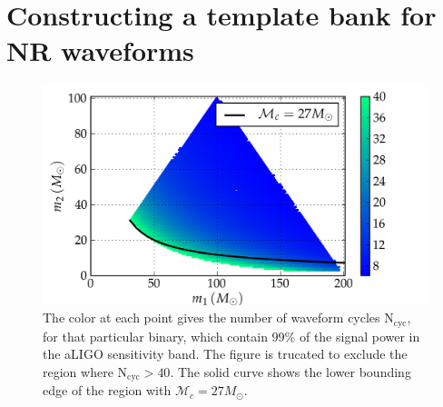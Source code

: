 \documentclass[aps,
prd,
twocolumn,
superscriptaddress,
lengthcheck,showpacs,letterpaper,nofootinbib,
floatfix]{revtex4-1}
\newcommand{\mn}{\mathrm{min}}
\newcommand{\mx}{\mathrm{max}}
\newcommand{\N}{\mathrm{N}}
\newcommand{\cyc}{\mathrm{cyc}}
\begin{document}
% 

%



\section{Constructing a template bank for NR waveforms}\label{s1:NRonlybank}

\begin{figure}
\centering
\includegraphics[width=1.1\columnwidth]{BBHm1m2_tlen_Ncyc40_0-99_Mchirp27_cropped-tiny.png}%
\caption{The color at each point gives the number 
of waveform cycles $\N_{\cyc}$, for that particular binary, which contain 
$99\%$ of the signal power in the aLIGO sensitivity band. The figure is 
trucated to exclude the region where $\N_{\cyc}>40$. The solid curve shows
the lower bounding edge of the region with $\mathcal{M}_c = 27M_\odot$.}
\label{fig:BBHregion}
\end{figure}
\end{document}
